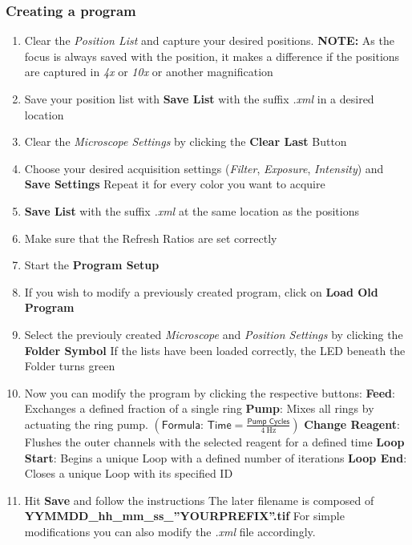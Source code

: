 \documentclass{article}
\newcounter{ListCounter}
\begin{document}
	\subsubsection{Creating a program}
	\begin{enumerate}
		\setcounter{enumi}{\value{ListCounter}}
	\item Clear the \textit{Position List} and capture your desired positions.
	\subitem \textbf{NOTE:} As the focus is always saved with the position, it makes a difference if the positions are captured in \textit{4x} or \textit{10x} or another magnification
	\item Save your position list with \textbf{Save List} with the suffix \textit{.xml} in a desired location
	\item Clear the \textit{Microscope Settings} by clicking the \textbf{Clear Last} Button
	\item Choose your desired acquisition settings (\textit{Filter}, \textit{Exposure}, \textit{Intensity}) and \textbf{Save Settings}
	\subitem Repeat it for every color you want to acquire
	\item \textbf{Save List} with the suffix \textit{.xml} at the same location as the positions
	\item Make sure that the Refresh Ratios are set correctly
	\item Start the \textbf{Program Setup}
	\item If you wish to modify a previously created program, click on \textbf{Load Old Program}
	\item Select the previouly created \textit{Microscope} and \textit{Position Settings} by clicking the \textbf{Folder Symbol}
	\subitem If the lists have been loaded correctly, the LED beneath the Folder turns green
	\item Now you can modify the program by clicking the respective buttons:
	\subitem \textbf{Feed}: Exchanges a defined fraction of a single ring
	\subitem \textbf{Pump}: Mixes all rings by actuating the ring pump. $\left(\textsf{Formula:\ Time}=\frac{\textsf{Pump\ Cycles}}{\SI{4}{\hertz}}\right)$
	\subitem \textbf{Change Reagent}: Flushes the outer channels with the selected reagent for a defined time
	\subitem \textbf{Loop Start}: Begins a unique Loop with a defined number of iterations 
	\subitem \textbf{Loop End}: Closes a unique Loop with its specified ID
	\item Hit \textbf{Save} and follow the instructions
	\subitem The later filename is composed of \textbf{YYMMDD\_{}hh\_{}mm\_{}ss\_{}''YOURPREFIX''.tif}
	\subitem For simple modifications you can also modify the \textit{.xml} file accordingly.
	
		\setcounter{ListCounter}{\value{enumi}}
\end{enumerate}
\end{document}

